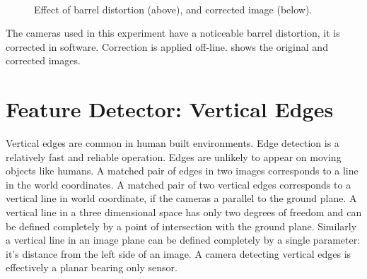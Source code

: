 \begin{figure}[htbp]
  \centering
{}\\

  \caption{Effect of barrel distortion (above), and corrected image (below).}
  \label{fig:barrel_distortion}
\end{figure}

The cameras used in this experiment have a noticeable barrel
distortion, it is corrected in software. Correction is applied
off-line.  shows the original and
corrected images.


\section{Feature Detector: Vertical Edges}

Vertical edges are common in human built environments. Edge detection
is a relatively fast and reliable operation. Edges are unlikely to
appear on moving objects like humans. A matched pair of edges in two
images corresponds to a line in the world coordinates. A matched pair
of two vertical edges corresponds to a vertical line in world
coordinate, if the cameras a parallel to the ground plane. A vertical
line in a three dimensional space has only two degrees of freedom and
can be defined completely by a point of intersection with the ground
plane. Similarly a vertical line in an image plane can be defined
completely by a single parameter: it's distance from the left side of
an image. A camera detecting vertical edges is effectively a planar
bearing only sensor. 

